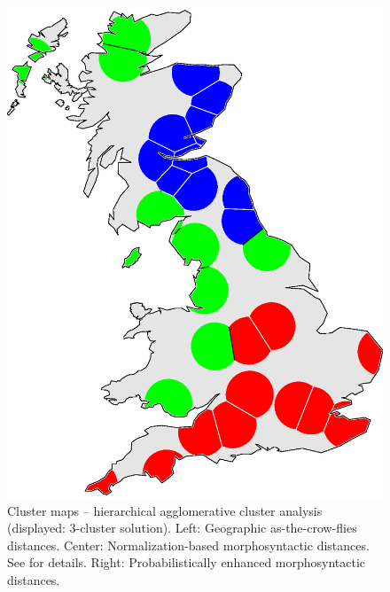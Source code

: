 \documentclass[output=paper]{LSP/langsci}
\begin{document}
\begin{figure} [tbp]
\begin{minipage}[b]{0.30\linewidth}
    \includegraphics [keepaspectratio,width=.98\textwidth] {illustrations/wolk_noisy_cluster_gam_r2-3groups.eps}
\end{minipage}
\caption{Cluster maps -- hierarchical agglomerative cluster analysis (displayed: 3-cluster solution). Left: Geographic as-the-crow-flies distances. Center: Normalization-based morphosyntactic distances. See \citet[chapter 6]{szmrecsanyi_grammatical_2013} for details. Right: Probabilistically enhanced morphosyntactic distances.} \label{clustermapsfig}
\end{figure}
\end{document}
